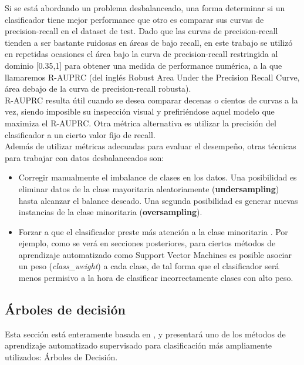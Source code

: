 Si se está abordando un problema desbalanceado, una forma determinar si un clasificador tiene mejor performance que otro es comparar sus curvas de precision-recall en el dataset de test. Dado que las curvas de precision-recall tienden a ser bastante ruidosas en áreas de bajo recall, en este trabajo se utilizó en repetidas ocasiones el área bajo la curva de precision-recall restringida al dominio [0.35,1] para obtener una medida de performance numérica, a la que llamaremos R-AUPRC (del inglés Robust Area Under the Precision Recall Curve, área debajo de la curva de precision-recall robusta).\\


R-AUPRC resulta útil cuando se desea comparar decenas o cientos de curvas a la vez, siendo imposible su inspección visual y prefiriéndose aquel modelo que maximiza el R-AUPRC. Otra métrica alternativa es utilizar la precisión del clasificador a un cierto valor fijo de recall. \\

Además de utilizar métricas adecuadas para evaluar el desempeño, otras técnicas para trabajar con datos desbalanceados son:

\begin{itemize}
\item Corregir manualmente el imbalance de clases en los datos. Una posibilidad es eliminar datos de la clase mayoritaria aleatoriamente (\textbf{undersampling}) \cite{nathalie} hasta alcanzar el balance deseado. Una segunda posibilidad es generar nuevas instancias de la clase minoritaria (\textbf{oversampling}). \cite{he}
\item Forzar a que el clasificador preste más atención a la clase minoritaria \cite{imbalanced_svm}. Por ejemplo, como se verá en secciones posteriores, para ciertos métodos de aprendizaje automatizado como Support Vector Machines es posible asociar un peso (\textit{class\_weight}) a cada clase, de tal forma que el clasificador será menos permisivo a la hora de clasificar incorrectamente clases con alto peso.
\end{itemize}

\subsection{Árboles de decisión}
Esta sección está enteramente basada en \cite{statisticallearning}, y presentará uno de los métodos de aprendizaje automatizado supervisado para clasificación más ampliamente utilizados: Árboles de Decisión. \\

